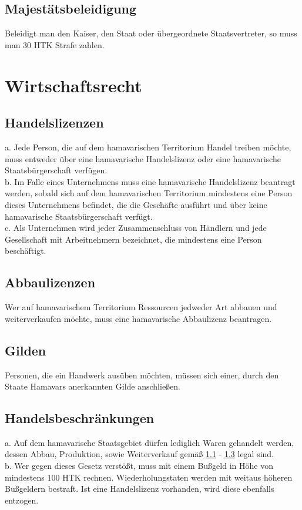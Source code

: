 \documentclass{article}
\begin{document}
\subsection{Majestätsbeleidigung}
Beleidigt man den Kaiser, den Staat oder übergeordnete Staatsvertreter, so muss man 30 HTK Strafe zahlen.

\section{Wirtschaftsrecht}
\subsection{Handelslizenzen}\label{lizenzen}
a. Jede Person, die auf dem hamavarischen Territorium Handel treiben möchte, muss entweder über eine hamavarische Handelslizenz oder eine hamavarische Staatsbürgerschaft verfügen.\\
b. Im Falle eines Unternehmens muss eine hamavarische Handelslizenz beantragt werden, sobald sich auf dem hamavarischen Territorium mindestens eine Person dieses Unternehmens befindet, die die Geschäfte ausführt und über keine hamavarische Staatsbürgerschaft verfügt.\\
c. Als Unternehmen wird jeder Zusammenschluss von Händlern und jede Gesellschaft mit Arbeitnehmern bezeichnet, die mindestens eine Person beschäftigt.

\subsection{Abbaulizenzen}
Wer auf hamavarischem Territorium Ressourcen jedweder Art abbauen und weiterverkaufen möchte, muss eine hamavarische Abbaulizenz beantragen.

\subsection{Gilden}\label{gilden}
Personen, die ein Handwerk ausüben möchten, müssen sich einer, durch den Staate Hamavars anerkannten Gilde anschließen.

\subsection{Handelsbeschränkungen}\label{beschraenkungen}
a. Auf dem hamavarische Staatsgebiet dürfen lediglich Waren gehandelt werden, dessen Abbau, Produktion, sowie Weiterverkauf gemäß \ref{lizenzen} - \ref{gilden} legal sind.\\
b. Wer gegen dieses Gesetz verstößt, muss mit einem Bußgeld in Höhe von mindestens 100 HTK rechnen. Wiederholungstaten werden mit weitaus höheren Bußgeldern bestraft. Ist eine Handelslizenz vorhanden, wird diese ebenfalls entzogen.
\end{document}
